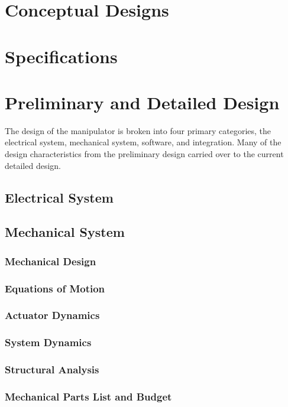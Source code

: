 

\normalem


\section{Conceptual Designs}


\section{Specifications}

\newpage
\section{Preliminary and Detailed Design}
The design of the manipulator is broken into four primary categories, the electrical system, mechanical system, software, and integration. Many of the design characteristics from the preliminary design carried over to the current detailed design.
\subsection{Electrical System}

\subsection{Mechanical System}

\subsubsection{Mechanical Design}

\subsubsection{Equations of Motion}

\subsubsection{Actuator Dynamics}

\subsubsection{System Dynamics}

\newpage
\subsubsection{Structural Analysis}

\newpage
\subsubsection{Mechanical Parts List and Budget}

% 
